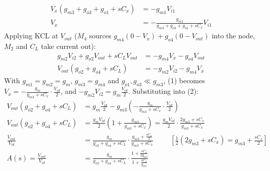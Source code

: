 \begin{enumerate}
\begin{align*}
      V_x (g_{m3} + g_{o3} + g_{o1} + sC_x) &= -g_{m1} V_{i1} \\
      V_x &= -\frac{g_{m1}}{g_{m3} + g_{o3} + g_{o1} + sC_x} V_{i1} \tag{1}
    \end{align*}
    Applying KCL at \(V_{out}\) (\(M_4\) sources \(g_{m4}(0 - V_x) + g_{o4}(0 - V_{out})\) into the node,
    \(M_2\) and \(C_L\) take current out):
    \begin{align*}
      g_{m2} V_{i2} + g_{o2} V_{out} + sC_L V_{out} &= -g_{m4} V_x - g_{o4} V_{out} \\
      V_{out}(g_{o2} + g_{o4} + sC_L) &= -g_{m2} V_{i2} - g_{m4} V_x \tag{2}
    \end{align*}
    With \(g_{m1} = g_{m2} = g_m\), \(g_{m3} = g_{m4}\) and
    \(g_{o1}, g_{o3} \ll g_{m3}\), (1) becomes
    \(V_x = -\frac{g_m}{g_{m3} + sC_x} \cdot \frac{V_{id}}{2}\), and
    \(-g_{m2} V_{i2} = g_m \frac{V_{id}}{2}\). Substituting into (2):
    \begin{align*}
      V_{out}(g_{o2} + g_{o4} + sC_L) &= g_m \frac{V_{id}}{2} - g_{m3}\left(-\frac{g_m}{g_{m3} + sC_x} \cdot \frac{V_{id}}{2}\right) \\
      V_{out}(g_{o2} + g_{o4} + sC_L) &= \frac{g_m V_{id}}{2}\left(1 + \frac{g_{m3}}{g_{m3} + sC_x}\right) = \frac{g_m V_{id}}{2} \cdot \frac{2 g_{m3} + sC_x}{g_{m3} + sC_x} \\
      \frac{V_{out}}{V_{id}} &= \frac{g_m}{g_{o2} + g_{o4} + sC_L} \cdot \frac{g_{m3} + \frac{sC_x}{2}}{g_{m3} + sC_x} \hspace{1cm} \left[\tfrac{1}{2}(2 g_{m3} + sC_x) = g_{m3} + \tfrac{sC_x}{2}\right] \\
      A(s) = \frac{V_{out}}{V_{id}} &= \frac{g_m}{g_{o2} + g_{o4} + sC_L} \cdot \frac{1 + \frac{sC_x}{2 g_{m3}}}{1 + \frac{sC_x}{g_{m3}}} \tag{3}
    \end{align*}
\end{enumerate}

